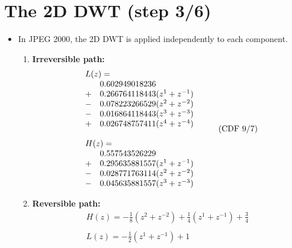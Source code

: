 \section{The 2D DWT (step 3/6)}
\begin{itemize}
\item In JPEG 2000, the 2D DWT is applied independently to each component.
  \begin{enumerate}
  \item \textbf{Irreversible path:}
    \begin{equation}
      \begin{array}{c}
        \begin{array}{ll}
          \multicolumn{2}{l}{L(z) =} \\
          & 0.602949018236\\
          + & 0.266764118443(z^1+z^{-1})\\
          - & 0.078223266529(z^2+z^{-2})\\
          - & 0.016864118443(z^3+z^{-3})\\
          + & 0.026748757411(z^4+z^{-4})
        \end{array}
        \\
        \\
        \begin{array}{ll}
          \multicolumn{2}{l}{H(z) =} \\
          & 0.557543526229\\
          + & 0.295635881557(z^1+z^{-1})\\
          - & 0.028771763114(z^2+z^{-2})\\
          - & 0.045635881557(z^3+z^{-3})
        \end{array}
      \end{array}
      \tag{CDF 9/7}
    \end{equation}
    \newpage
  \item \textbf{Reversible path:}
    \begin{equation}
      \begin{array}{l}
      H(z) = -\frac{1}{8}(z^2+z^{-2}) + \frac{1}{4}(z^1+z^{-1}) +
      \frac{3}{4}\\~\\
      L(z) = -\frac{1}{2}(z^1+z^{-1}) + 1
    \end{array}
    \tag{Spline 5/3}
    \end{equation}
  \end{enumerate}
\end{itemize}




